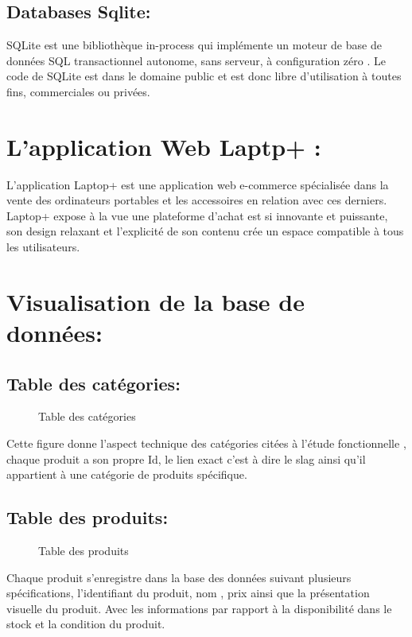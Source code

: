 \documentclass[a4paper]{report}
\begin{document}
\begin{doublespace}
    \subsection{Databases Sqlite:}
    \begin{figure}[H]
        \raggedleft{
        }
    \end{figure}
    SQLite est une bibliothèque in-process qui implémente
    un moteur de base de données SQL transactionnel autonome, sans serveur, à
    configuration zéro . Le code de SQLite est dans le domaine public et est donc
    libre d'utilisation à toutes fins, commerciales ou privées.
    \newpage
    \section{L'application Web Laptp+ :}
    L'application Laptop+ est une application web
    e-commerce spécialisée dans la vente des ordinateurs portables et les
    accessoires en relation avec ces derniers. \\Laptop+ expose à la vue une
    plateforme d'achat est si innovante et puissante, son design relaxant et
    l’explicité de son contenu crée un espace compatible à tous les utilisateurs.

    \section{ Visualisation de la base de données:}
    \subsection{ Table des catégories: }
    \begin{figure}[H]
        \caption{Table des catégories}
    \end{figure}
    Cette figure donne l'aspect technique des catégories
    citées à l'étude
    fonctionnelle , chaque produit a son propre Id, le lien
    exact c'est à dire le slag ainsi qu'il appartient à une catégorie de produits
    spécifique.
    \subsection{ Table des produits: }
    \begin{figure}[H]

        \caption{Table des produits}
    \end{figure}
    Chaque produit s'enregistre dans la base des données
    suivant plusieurs spécifications, l'identifiant du produit, nom , prix ainsi
    que la présentation visuelle du produit. Avec les informations par rapport à la
    disponibilité dans le stock et la condition du produit.

\end{doublespace}
\end{document}
